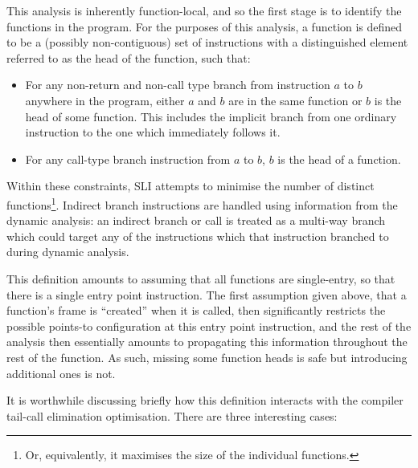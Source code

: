This analysis is inherently function-local, and so the first stage is
to identify the functions in the program.  For the purposes of this
analysis, a function is defined to be a (possibly non-contiguous) set
of instructions with a distinguished element referred to as the head
of the function, such that:

\begin{itemize}
\item
  For any non-return and non-call type branch from instruction $a$ to
  $b$ anywhere in the program, either $a$ and $b$ are in the same
  function or $b$ is the head of some function.  This includes the
  implicit branch from one ordinary instruction to the one which
  immediately follows it.
\item
  For any call-type branch instruction from $a$ to $b$, $b$ is the
  head of a function.
\end{itemize}

Within these constraints, SLI attempts to minimise the number of
distinct functions\footnote{Or, equivalently, it maximises the size of
  the individual functions.}.
Indirect branch instructions are handled using information from the
dynamic analysis: an indirect branch or call is treated as a multi-way
branch which could target any of the instructions which that
instruction branched to during dynamic analysis.

This definition amounts to assuming that all functions are
single-entry, so that there is a single entry point instruction.  The
first assumption given above, that a function's frame is ``created''
when it is called, then significantly restricts the possible points-to
configuration at this entry point instruction, and the rest of the
analysis then essentially amounts to propagating this information
throughout the rest of the function.  As such, missing some function
heads is safe but introducing additional ones is not.

It is worthwhile discussing briefly how this definition interacts with
the compiler tail-call elimination optimisation.  There are three
interesting cases:

